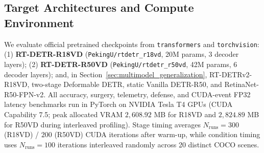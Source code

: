\documentclass[preprint,10pt]{elsarticle}
\begin{document}
\subsection{Target Architectures and Compute Environment}
We evaluate official pretrained checkpoints from \texttt{transformers} and \texttt{torchvision}: (1) \textbf{RT-DETR-R18VD} (\texttt{PekingU/rtdetr\_r18vd}, 20M params, 3 decoder layers); (2) \textbf{RT-DETR-R50VD} (\texttt{PekingU/rtdetr\_r50vd}, 42M params, 6 decoder layers); and, in Section~\ref{sec:multimodel_generalization}, RT-DETRv2-R18VD, two-stage Deformable DETR, static Vanilla DETR-R50, and RetinaNet-R50-FPN-v2. All accuracy, surgery, telemetry, defense, and CUDA-event FP32 latency benchmarks run in PyTorch on NVIDIA Tesla T4 GPUs (CUDA Capability 7.5; peak allocated VRAM $2,608.92$ MB for R18VD and $2,824.89$ MB for R50VD during interleaved profiling). Stage timing averages $N_{\mathrm{runs}} = 300$ (R18VD) / $200$ (R50VD) CUDA iterations after warm-up, while condition timing uses $N_{\mathrm{runs}} = 100$ iterations interleaved randomly across 20 distinct COCO scenes.
\end{document}
